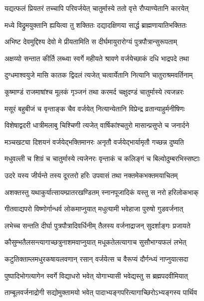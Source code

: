 \twolineshloka
{यद्यत्फलं प्रियतरं तच्चापि परिवर्जयेत्}
{चातुर्मास्ये ततो वृत्ते रौप्याण्येतानि कारयेत्} %

\twolineshloka
{मध्ये विद्रुमयुक्तानि ह्ययित्वा तु शक्तितः}
{दद्यादक्षिणया सार्द्ध ब्राह्मणायातिभक्तितः} %

\twolineshloka
{अभिष्ट देवमुद्दिश्य देवो मे प्रीयतामिति}
{स दीर्घमायुरारोग्यं पुत्रपौत्रान्सुरूपताम्} %

\twolineshloka
{अक्षय्यो सन्तात कीर्ति लब्ध्वा स्वर्गे महीयते}
{श्रावणे वर्जयेच्छाकं दधि भाद्रपदे तथा} %

\twolineshloka
{दुग्धमाश्वयुजे मासि कातक द्विदलं त्यजेत्}
{चत्वार्येतानि नित्यानि चातुराश्रमवर्तिनाम्} %

\twolineshloka
{कूष्माण्डं राजमाषांश्च मूलकं गृञ्जनं तथा}
{करमर्द चक्षुदण्डं चातुर्मास्ये त्यजन्नरः} %

\twolineshloka
{मसूरं बहुबीजं च वृन्ताङ्क चैव वर्जयेत्}
{नित्यान्येतानि विप्रेन्द्र व्रतान्याहुर्मनीषिणः} %

\twolineshloka
{विशेषाद्वदरी धात्रीमलाबु चिश्चिणी त्यजेत्}
{वार्षिकांश्चतुरो मासान्प्रसुप्ते च जनार्दने} %

\twolineshloka
{मञ्चखट्या दिशयनं वर्जयेद्भक्तिमानरः}
{अनृतौ वर्जयेद्भार्यामृतौ गच्छन्न दुष्यति} %

\twolineshloka
{मधुवल्ली च शिग्रं च चातुर्मास्ये त्यजेनरः}
{वृन्ताकं च कलिङ्गं च बिल्वोदुम्बरभिस्सष्टाः} %

\twolineshloka
{उदरे यस्य जीर्यन्ते तस्य दूरतरो हरिः}
{उपवासं तथा नक्तमेकभक्तमयाचितम्} %

\twolineshloka
{अशक्तस्तु यथाकुर्यात्सायम्प्रातरखण्डितम्}
{स्नानपूजादिकं यस्तु स नरो हरिलोकभाक्} %

\twolineshloka
{गीतवाद्यपरो विष्णोर्गान्धर्व लोकमाप्नुयात्}
{मधुत्यामी भवेहाजा पुरुषो गुडवर्जनात्} %

\twolineshloka
{लभेच्च सन्तति दीर्घा पुत्रपौत्रादिवर्धिनीम्}
{तैलस्य वर्जनाद्राजन् सुदर्शाङ्गः प्रजायते} %

\twolineshloka
{कौसुम्भतैलसन्त्यागाच्छत्रुनाशमवाप्नुयात्}
{मधूकतेलत्यागाच सुसौभाग्यफलं लभेत्} %

\twolineshloka
{कटुतिक्ताम्लमधुरकषायलवणान् रसान्}
{वर्जयेत्स च वैरूप्यं दौर्गन्ध्यं नाप्नुयात्सदा} %

\twolineshloka
{पुष्पादिभोगत्यागेन स्वर्गे विद्याधरो भवेत्}
{योगाभ्यासी भवेद्यस्तु स ब्रह्मपदवीमियात्} %

\twolineshloka
{ताम्बूलवर्जनाद्रोगी सद्योमुक्तामयो भवेत्}
{पादाभ्यङ्गपरित्यागाच्छिरोऽभ्यङ्गस्य पार्थिव} %

